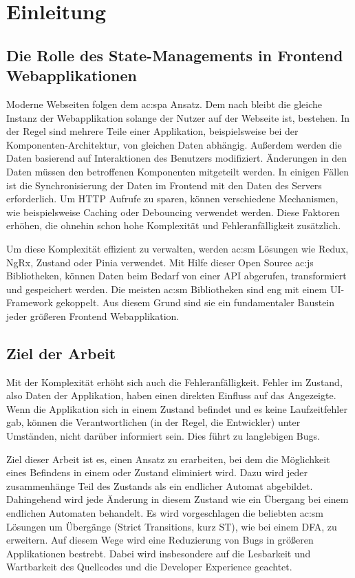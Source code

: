 \chapter{Einleitung}

\section{Die Rolle des State-Managements in Frontend Webapplikationen}

Moderne Webseiten folgen dem \acrlong{ac:spa} Ansatz. Dem nach bleibt die gleiche Instanz der Webapplikation solange der Nutzer auf der Webseite ist, bestehen. In der Regel sind mehrere Teile einer Applikation, beispielsweise bei der Komponenten-Architektur, von gleichen Daten abhängig. Außerdem werden die Daten basierend auf Interaktionen des Benutzers modifiziert. Änderungen in den Daten müssen den betroffenen Komponenten mitgeteilt werden. In einigen Fällen ist die Synchronisierung der Daten im Frontend mit den Daten des Servers erforderlich. Um HTTP Aufrufe zu sparen, können verschiedene Mechanismen, wie beispielsweise Caching oder Debouncing verwendet werden. Diese Faktoren erhöhen, die ohnehin schon hohe Komplexität und Fehleranfälligkeit zusätzlich.

Um diese Komplexität effizient zu verwalten, werden \acrlong{ac:sm} Lösungen wie Redux, NgRx, Zustand oder Pinia verwendet. Mit Hilfe dieser Open Source \acrlong{ac:js} Bibliotheken, können Daten beim Bedarf von einer API abgerufen, transformiert und gespeichert werden. Die meisten \acrlong{ac:sm} Bibliotheken sind eng mit einem UI-Framework gekoppelt. Aus diesem Grund sind sie ein fundamentaler Baustein jeder größeren Frontend Webapplikation.

\section{Ziel der Arbeit}

Mit der Komplexität erhöht sich auch die Fehleranfälligkeit. Fehler im Zustand, also Daten der Applikation, haben einen direkten Einfluss auf das Angezeigte. Wenn die Applikation sich in einem  Zustand befindet und es keine Laufzeitfehler gab, können die Verantwortlichen (in der Regel, die Entwickler) unter Umständen, nicht darüber informiert sein. Dies führt zu langlebigen Bugs.

Ziel dieser Arbeit ist es, einen Ansatz zu erarbeiten, bei dem die Möglichkeit eines Befindens in einem  oder  Zustand eliminiert wird. Dazu wird jeder zusammenhänge Teil des Zustands als ein endlicher Automat abgebildet. Dahingehend wird jede Änderung in diesem Zustand wie ein Übergang bei einem endlichen Automaten behandelt. Es wird vorgeschlagen die beliebten \acrlong{ac:sm} Lösungen um  Übergänge (Strict Transitions, kurz ST), wie bei einem DFA, zu erweitern. Auf diesem Wege wird eine Reduzierung von Bugs in größeren Applikationen bestrebt. Dabei wird insbesondere auf die Lesbarkeit und Wartbarkeit des Quellcodes und die Developer Experience geachtet.

